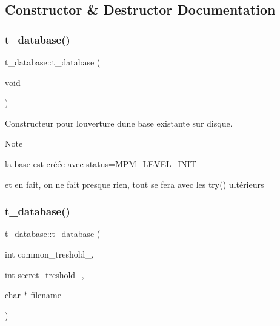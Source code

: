 \subsection{Constructor \& Destructor Documentation}
\mbox{\label{classt__database_a17ae86a03bc66df3fee4e1d0ce319a42}} 
\subsubsection{\texorpdfstring{t\+\_\+database()}{t\_database()}\hspace{0.1cm}{\footnotesize\ttfamily [1/2]}}
{\footnotesize\ttfamily t\+\_\+database\+::t\+\_\+database (\begin{DoxyParamCaption}\item[{void}]{ }\end{DoxyParamCaption})}



Constructeur pour l\textquotesingle{}ouverture d\textquotesingle{}une base existante sur disque. 

\begin{DoxyNote}{Note}

\begin{DoxyItemize}
\item la base est créée avec status=M\+P\+M\+\_\+\+L\+E\+V\+E\+L\+\_\+\+I\+N\+IT
\item et en fait, on ne fait presque rien, tout se fera avec les try() ultérieurs 
\end{DoxyItemize}
\end{DoxyNote}
\mbox{\label{classt__database_a3131dd266649fa3f285dc9bf743cd38c}} 
\subsubsection{\texorpdfstring{t\+\_\+database()}{t\_database()}\hspace{0.1cm}{\footnotesize\ttfamily [2/2]}}
{\footnotesize\ttfamily t\+\_\+database\+::t\+\_\+database (\begin{DoxyParamCaption}\item[{int}]{common\+\_\+treshold\+\_\+,  }\item[{int}]{secret\+\_\+treshold\+\_\+,  }\item[{char $\ast$}]{filename\+\_\+ }\end{DoxyParamCaption})}




